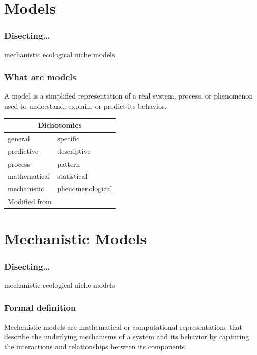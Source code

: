 \documentclass{beamer}
\begin{document}
\section{Models}

\begin{frame}
  \frametitle{Disecting\ldots}
  \Large
  \centering
  \textcolor{gray!25}{mechanistic}
  \textcolor{gray!25}{ecological niche}
  models
\end{frame}

\begin{frame}
  \frametitle{What are models}
  A model is a simplified representation of a real system, process, or phenomenon used to understand, explain, or predict its behavior.

  \vfill \pause

  \begin{table}
    \begin{tabular}{ll}
      \toprule
      \multicolumn{2}{c}{Dichotomies}                                 \\
      \midrule
      general      & specific                                         \\ \pause
      predictive   & descriptive                                      \\ \pause
      process      & pattern                                          \\ \pause
      mathematical & statistical                                      \\ \pause
      mechanistic  & phenomenological                                 \\
      \bottomrule
      \multicolumn{2}{l}{\scriptsize Modified from \cite{bolker2008}} \\
    \end{tabular}
  \end{table}
\end{frame}

\section{Mechanistic Models}

\begin{frame}
  \frametitle{Disecting\ldots}
  \Large
  \centering
  mechanistic
  \textcolor{gray!25}{ecological niche}
  models
\end{frame}


\begin{frame}
  \frametitle{Formal definition}
  Mechanistic models are mathematical or computational representations that describe the underlying mechanisms of a system and its behavior by capturing the interactions and relationships between its components.
\end{frame}
\end{document}
